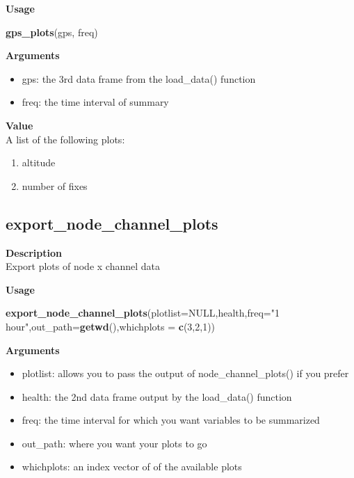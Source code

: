 \documentclass[
]{book}
\newenvironment{Shaded}{\begin{snugshade}}{\end{snugshade}}
\newcommand{\DataTypeTok}[1]{\textcolor[rgb]{0.13,0.29,0.53}{#1}}
\newcommand{\DecValTok}[1]{\textcolor[rgb]{0.00,0.00,0.81}{#1}}
\newcommand{\KeywordTok}[1]{\textcolor[rgb]{0.13,0.29,0.53}{\textbf{#1}}}
\newcommand{\NormalTok}[1]{#1}
\newcommand{\OtherTok}[1]{\textcolor[rgb]{0.56,0.35,0.01}{#1}}
\newcommand{\StringTok}[1]{\textcolor[rgb]{0.31,0.60,0.02}{#1}}
\providecommand{\tightlist}{%
  \setlength{\itemsep}{0pt}\setlength{\parskip}{0pt}}
\begin{document}
\textbf{Usage}

\begin{Shaded}
\begin{Highlighting}[]
\KeywordTok{gps_plots}\NormalTok{(gps, freq)  }
\end{Highlighting}
\end{Shaded}

\textbf{Arguments}

\begin{itemize}
\tightlist
\item
  gps: the 3rd data frame from the load\_data() function\\
\item
  freq: the time interval of summary
\end{itemize}

\textbf{Value}\\
A list of the following plots:

\begin{enumerate}
\def\labelenumi{\arabic{enumi}.}
\tightlist
\item
  altitude\\
\item
  number of fixes
\end{enumerate}

\hypertarget{export_node_channel_plots}{%
\subsection{export\_node\_channel\_plots}\label{export_node_channel_plots}}

\textbf{Description}\\
Export plots of node x channel data

\textbf{Usage}

\begin{Shaded}
\begin{Highlighting}[]
\KeywordTok{export_node_channel_plots}\NormalTok{(}\DataTypeTok{plotlist=}\OtherTok{NULL}\NormalTok{,health,}\DataTypeTok{freq=}\StringTok{"1 hour"}\NormalTok{,}\DataTypeTok{out_path=}\KeywordTok{getwd}\NormalTok{(),}\DataTypeTok{whichplots =} \KeywordTok{c}\NormalTok{(}\DecValTok{3}\NormalTok{,}\DecValTok{2}\NormalTok{,}\DecValTok{1}\NormalTok{))}
\end{Highlighting}
\end{Shaded}

\textbf{Arguments}

\begin{itemize}
\tightlist
\item
  plotlist: allows you to pass the output of node\_channel\_plots() if you prefer\\
\item
  health: the 2nd data frame output by the load\_data() function\\
\item
  freq: the time interval for which you want variables to be summarized\\
\item
  out\_path: where you want your plots to go\\
\item
  whichplots: an index vector of of the available plots
\end{itemize}
\end{document}
